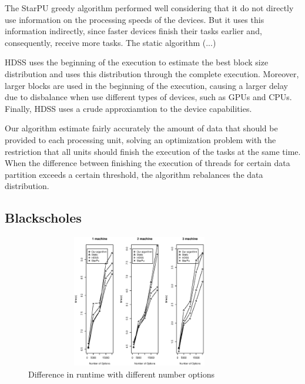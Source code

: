 \documentclass[journal]{IEEEtran}
\begin{document}
The StarPU greedy algorithm performed well considering that it do not directly
use information on the processing speeds of the devices. But it uses this
information indirectly, since faster devices finish their tasks earlier and,
consequently, receive more tasks. The static algorithm (...)


HDSS uses the beginning of the execution to estimate the best block size
distribution and uses this distribution through the complete
execution. Moreover, larger blocks are used in the beginning of the execution,
causing a larger delay due to disbalance when use different types of devices,
such as GPUs and CPUs. Finally, HDSS uses a crude approxiamtion to the device
capabilities.

Our algorithm estimate fairly accurately the amount of data that should be
provided to each processing unit, solving an optimization problem with the
restriction that all units should finish the execution of the tasks at the same
time. When the difference between finishing the execution of threads for certain
data partition exceeds a certain threshold, the algorithm rebalances the data
distribution.

\subsection{Blackscholes}

\begin{figure}[htb]
	\begin{center}
	\centering
			\includegraphics[width=10cm,height=5.8cm]{MaquinaBlack.eps}
	\caption{Difference in runtime with different number options}
	\label{fig:black}
	\end{center}
\end{figure}
\end{document}
